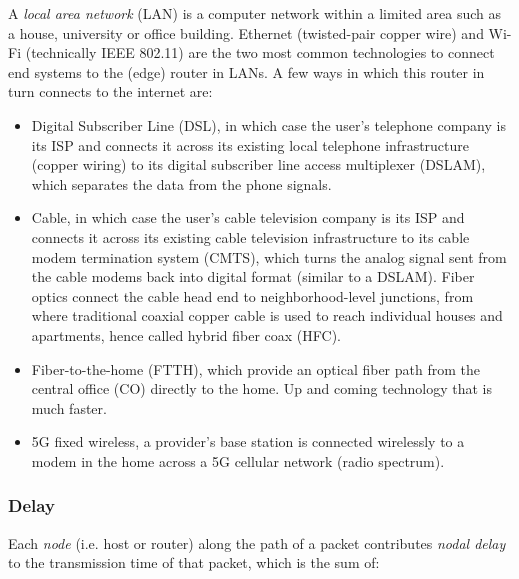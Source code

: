 \documentclass[8pt, table, xcdraw]{article}%
\begin{document}
A \emph{local area network} (LAN) is a computer network within a limited area such as a house, university or office building. Ethernet (twisted-pair copper wire) and Wi-Fi (technically IEEE 802.11) are the two most common technologies to connect end systems to the (edge) router in LANs. A few ways in which this router in turn connects to the internet are:

\begin{itemize}
    \item Digital Subscriber Line (DSL), in which case the user's telephone company is its ISP and connects it across its existing local telephone infrastructure (copper wiring) to its digital subscriber line access multiplexer (DSLAM), which separates the data from the phone signals.
    \item Cable, in which case the user's cable television company is its ISP and connects it across its existing cable television infrastructure to its cable modem termination system (CMTS), which turns the analog signal sent from the cable modems back into digital format (similar to a DSLAM). Fiber optics connect the cable head end to neighborhood-level junctions, from where traditional coaxial copper cable is used to reach individual houses and apartments, hence called hybrid fiber coax (HFC).
    \item Fiber-to-the-home (FTTH), which provide an optical fiber path from the central office (CO) directly to the home. Up and coming technology that is much faster.
    \item 5G fixed wireless, a provider’s base station is connected wirelessly to a modem in the home across a 5G cellular network (radio spectrum).
\end{itemize}

\subsubsection{Delay} \label{ch:intro:delay}

Each \emph{node} (i.e. host or router) along the path of a packet contributes \emph{nodal delay} to the transmission time of that packet, which is the sum of:
\end{document}
